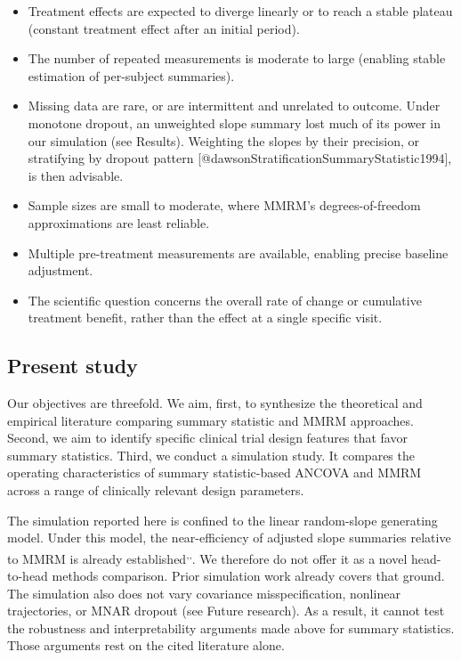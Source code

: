 \documentclass[
  11pt,
]{article}
\begin{document}
\begin{itemize}
\item Treatment effects are expected to diverge linearly or
  to reach a stable plateau (constant treatment effect after
  an initial period).
\item The number of repeated measurements is moderate to
  large (enabling stable estimation of per-subject summaries).
\item Missing data are rare, or are intermittent and unrelated
  to outcome. Under monotone dropout, an unweighted slope
  summary lost much of its power in our simulation (see
  Results). Weighting the slopes by their precision, or
  stratifying by dropout pattern
  [@dawsonStratificationSummaryStatistic1994], is then advisable.
\item Sample sizes are small to moderate, where MMRM's
  degrees-of-freedom approximations are least reliable.
\item Multiple pre-treatment measurements are available,
  enabling precise baseline adjustment.
\item The scientific question concerns the overall rate of
  change or cumulative treatment benefit, rather than the
  effect at a single specific visit.
\end{itemize}

\subsection{Present study}\label{present-study}

Our objectives are threefold. We aim, first, to synthesize the
theoretical and empirical literature comparing summary
statistic and MMRM approaches. Second, we aim to identify
specific clinical trial design features that favor summary
statistics. Third, we conduct a simulation study. It compares
the operating characteristics of summary statistic-based
ANCOVA and MMRM across a range of clinically relevant design
parameters.

The simulation reported here is confined to the linear
random-slope generating model. Under this model, the
near-efficiency of adjusted slope summaries relative to MMRM
is already established\textsuperscript{,,}. We therefore do not offer
it as a novel head-to-head methods comparison. Prior
simulation work already covers that ground. The simulation
also does not vary covariance misspecification, nonlinear
trajectories, or MNAR dropout (see Future research). As a
result, it cannot test the robustness and interpretability
arguments made above for summary statistics. Those arguments
rest on the cited literature alone.
\end{document}
